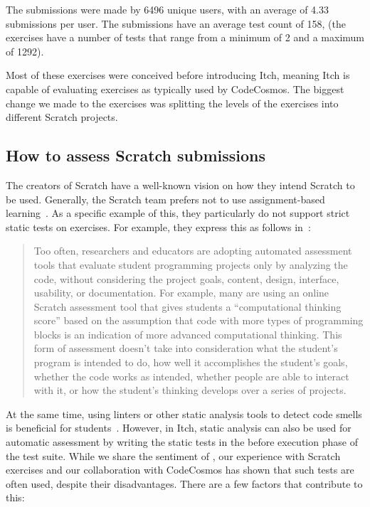 \documentclass[../main]{subfiles}
\begin{document}
The submissions were made by \num{6496} unique users, with an average of \num{4.33} submissions per user.
The submissions have an average test count of \num{158}, (the exercises have a number of tests that range from a minimum of \num{2} and a maximum of \num{1292}).

Most of these exercises were conceived before introducing Itch, meaning Itch is capable of evaluating exercises as typically used by CodeCosmos.
The biggest change we made to the exercises was splitting the levels of the exercises into different Scratch projects.

\subsection{How to assess Scratch submissions}\label{subsec:how-to-evaluate-scratch-submissions}

The creators of Scratch have a well-known vision on how they intend Scratch to be used.
Generally, the Scratch team prefers not to use assignment-based learning~\autocite{resnickCodingCrossroads2020}.
As a specific example of this, they particularly do not support strict static tests on exercises.
For example, they express this as follows in~\autocite{resnickCodingCrossroads2020}:

\begin{quotation}
    Too often, researchers and educators are adopting automated assessment tools that evaluate student programming projects only by analyzing the code, without considering the project goals, content, design, interface, usability, or documentation.
    For example, many are using an online Scratch assessment tool that gives students a ``computational thinking score'' based on the assumption that code with more types of programming blocks is an indication of more advanced computational thinking.
    This form of assessment doesn't take into consideration what the student's program is intended to do, how well it accomplishes the student's goals, whether the code works as intended, whether people are able to interact with it, or how the student's thinking develops over a series of projects.
\end{quotation}

At the same time, using linters or other static analysis tools to detect code smells is beneficial for students~\autocite{hermansCodeSmellsHamper2016}.
However, in Itch, static analysis can also be used for automatic assessment by writing the static tests in the before execution phase of the test suite.
While we share the sentiment of \citeauthor{resnickCodingCrossroads2020}, our experience with Scratch exercises and our collaboration with CodeCosmos has shown that such tests are often used, despite their disadvantages.
There are a few factors that contribute to this:
\end{document}
